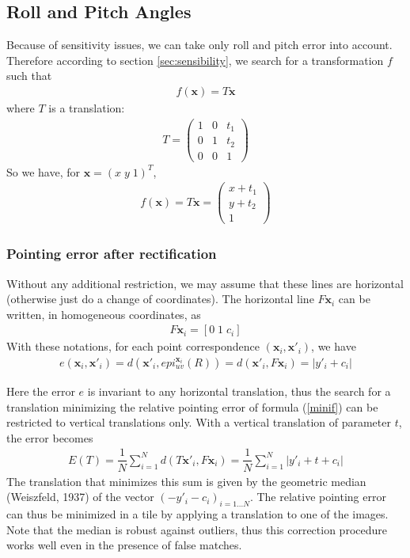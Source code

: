 \documentclass[paper=a4, fontsize=11pt, onecolumn, tikz, dvipsnames, svgnames, x11names]{article}
\begin{document}
\subsection{Roll and Pitch Angles}
Because of sensitivity issues, we can take only roll and pitch error into account. Therefore according to section \ref{sec:sensibility}, we search for a transformation $f$ such that
\begin{align*}
f(\textbf{x}) = T\textbf{x}
\end{align*}
where $T$ is a translation:
\begin{align*}
T =
\begin{pmatrix}
1 & 0 & t_1 \\
0 & 1 & t_2 \\
0 & 0 & 1
\end{pmatrix}
\end{align*}
So we have, for $ \textbf{x} = (  x \; y \; 1)^T $,
\begin{align*}
f(\textbf{x}) = T\textbf{x} =
\begin{pmatrix}
x + t_1 \\
y + t_2 \\
1
\end{pmatrix}
\end{align*}

\subsubsection{Pointing error after rectification}
Without any additional restriction, we may assume that these lines are horizontal (otherwise just do a change of coordinates). The horizontal line $F\textbf{x}_i$ can be written, in homogeneous coordinates, as
\begin{align*}
F\textbf{x}_i = \left[ 0 \; 1 \; c_i \right]
\end{align*}
With these notations, for each point correspondence $(\textbf{x}_i , \textbf{x}'_i)$, we have
\begin{align*}
e(\textbf{x}_i, \textbf{x}'_i) = d(\textbf{x}'_i, epi^{\textbf{x}_i}_{u v}(R)) = d(\textbf{x}'_i, F\textbf{x}_i) = | y'_i + c_i|
\end{align*}

Here the error $e$ is invariant to any horizontal translation, thus the search for a translation minimizing the relative pointing error of formula (\ref{minif}) can be restricted to vertical translations only. With a vertical translation of parameter $t$, the error becomes
\begin{align*}
E(T) = \dfrac{1}{N} \sum\limits_{i=1}^{N} d(T\textbf{x}'_i, F\textbf{x}_i) = \dfrac{1}{N} \sum\limits_{i=1}^{N} | y'_i + t+ c_i|
\end{align*}
The translation that minimizes this sum is given by the geometric median (Weiszfeld, 1937) of the vector $(-y'_i - c_i )_{i=1...N}$.  The relative pointing error can thus be minimized in a tile by applying a translation to one of the images. Note that the median is robust against outliers, thus this correction procedure works well even in the presence of false matches.
\end{document}
